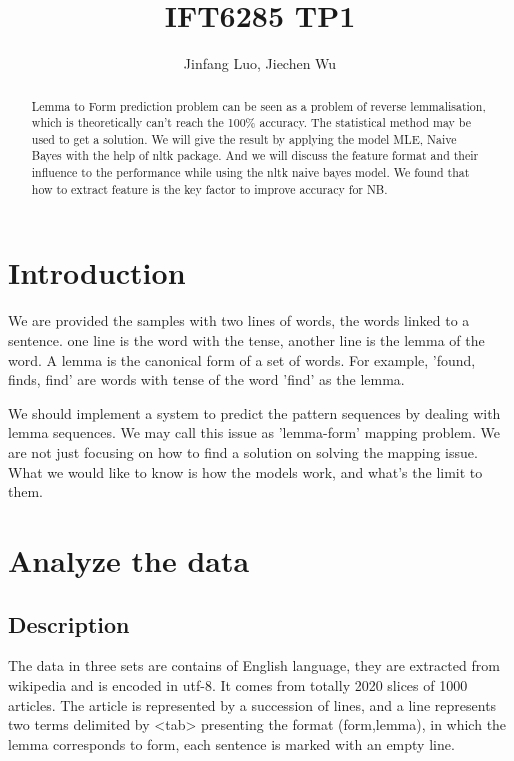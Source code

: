 \documentclass[a4paper]{article}
\title{IFT6285 TP1}
\author{Jinfang Luo, Jiechen Wu}
\begin{document}
\maketitle

\begin{abstract}
Lemma to Form prediction problem can be seen as a problem of reverse lemmalisation, which is theoretically can't reach the 100\% accuracy. The statistical method may be used to get a solution. We will give the result by applying the model MLE, Naive Bayes with the help of nltk package. And we will discuss the feature format and their influence to the performance while using the nltk naive bayes model. We found that how to extract feature is the key factor to improve accuracy for NB.
\end{abstract}

\section{Introduction}
We are provided the samples with two lines of words, the words linked to a sentence. one line is the word with the tense, another line is the lemma of the word. A lemma is the canonical form of a set of words. For example, 'found, finds, find' are words with tense of the word 'find' as the lemma.

We should implement a system to predict the pattern sequences by dealing with lemma sequences. We may call this issue as 'lemma-form' mapping problem. We are not just focusing on how to find a solution on solving the mapping issue. What we would like to know is how the models work, and what's the limit to them.  

\section{Analyze the data}

\subsection{Description}
The data in three sets are contains of English language, they are extracted from wikipedia and is encoded in utf-8. It comes from totally 2020 slices of 1000 articles. The article is represented by a succession of lines, and a line represents two terms delimited by <tab> presenting the format (form,lemma), in which the lemma corresponds to form, each sentence is marked with an empty line. 
\end{document}
